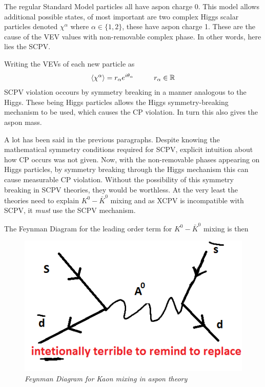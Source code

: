 The regular Standard Model particles all have aspon charge 0. This model allows additional possible states, of most important are two complex Higgs scalar particles denoted $\chi^\alpha$ where $\alpha \in \{1,2\}$, these have aspon charge 1. These are the cause of the VEV values with non-removable complex phase. In other words, here lies the SCPV.

Writing the VEVs of each new particle as
\begin{align*}
\braket{\chi^\alpha}=r_\alpha e^{i \theta_\alpha}\hspace{10mm}r_\alpha \in \mathbb{R}
\end{align*}
SCPV violation occours by symmetry breaking in a manner analogous to the Higgs. These being Higgs particles allows the Higgs symmetry-breaking mechanism to be used, which causes the CP violation. In turn this also gives the aspon mass.

A lot has been said in the previous paragraphs. Despite knowing the mathematical symmetry conditions required for SCPV, explicit intuition about how CP occurs was not given. Now, with the non-removable phases appearing on Higgs particles, by symmetry breaking through the Higgs mechanism this can cause measurable CP violation. Without the possibility of this symmetry breaking in SCPV theories, they would be worthless. At the very least the theories need to explain $K^0-\bar{K}^0$ mixing and as XCPV is incompatible with SCPV, it \textit{must} use the SCPV mechanism.

The Feynman Diagram for the leading order term for $K^0-\bar{K}^0$ mixing is then
\begin{figure}[h!]
\begin{center}
\includegraphics[scale=0.5]{figs/kill_me.png}
\end{center}
\caption{\textit{Feynman Diagram for Kaon mixing in aspon theory }}
\label{asponkaon}
\end{figure}


